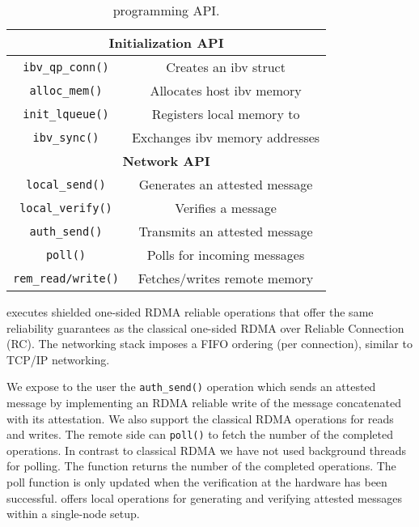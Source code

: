 \begin{table}
\begin{center}
\begin{tabular}{ |c|c| } 
 \hline
 \multicolumn{2}{|c|}{{\bf Initialization API}} \\ [0.5ex] \hline 
 {\tt ibv\_qp\_conn()} & Creates an ibv struct \\
 {\tt alloc\_mem()}    & Allocates host ibv memory \\
 {\tt init\_lqueue()}    & Registers local memory to \projecttitle{} \\
 {\tt ibv\_sync()} & Exchanges ibv memory addresses \\
 \hline
 \hline
 \multicolumn{2}{|c|}{{\bf Network API}} \\ [0.5ex] \hline 
 {\tt local\_send()}    & Generates an attested message \\
 {\tt local\_verify()}    & Verifies a message \\
 {\tt auth\_send()} &  Transmits an attested message \\
 {\tt poll()} &  Polls for incoming messages \\
 {\tt rem\_read/write()} &  Fetches/writes remote memory \\
 \hline
\end{tabular}
\end{center}
\caption{\projecttitle{} programming API.}
\label{tab:apis}
\end{table}




\projecttitle{} executes shielded one-sided RDMA reliable operations that offer the same reliability guarantees as the classical one-sided RDMA over Reliable Connection (RC). The networking stack imposes a FIFO ordering (per connection), similar to TCP/IP networking.

We expose to the user the {\tt auth\_send()} operation which sends an attested message by implementing an RDMA reliable write of the message concatenated with its attestation. We also support the classical RDMA operations for reads and writes. The remote side can {\tt poll()} to fetch the number of the completed operations. In contrast to classical RDMA we have not used background threads for polling. The function returns the number of the completed operations. The poll function is only updated when the verification at the \projecttitle{} hardware has been successful.  \projecttitle{} offers local operations for generating and verifying attested messages within a single-node setup.


